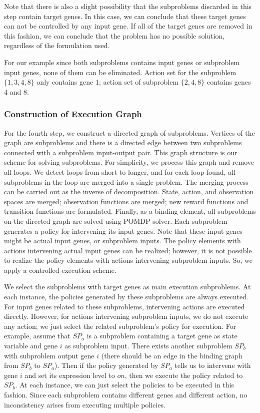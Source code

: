 Note that there is also a slight possibility that the subproblems discarded in this step contain target
genes. In this case, we can conclude that these target genes can not be controlled by any input gene. If all
of the target genes are removed in this fashion, we can conclude that the problem has no possible solution,
regardless of the formulation used.

For our example since both subproblems contains input genes or subproblem input genes, none of them can be eliminated. Action set for the subproblem $\{1,3,4,8\}$ only contains gene 1; action set of subproblem $\{2,4,8\}$ contains genes 4 and 8.

\subsubsection{Construction of Execution Graph}
For the fourth step, we construct a directed graph of subproblems. Vertices of the graph are subproblems and
there is a directed edge between two subproblems connected with a subproblem input-output pair. This graph
structure is our scheme for solving subproblems. For simplicity, we process this graph and remove all loops.
We detect loops from short to longer, and for each loop found, all subproblems in the loop are merged into a
single problem. The merging process can be carried out as the inverse of decomposition. State, action, and
observation spaces are merged; observation functions are merged; new reward functions and transition
functions are formulated. Finally, as a binding element, all subproblems on the directed graph are solved
using POMDP solver. Each subproblem generates a policy for intervening its input genes. Note that these input
genes might be actual input genes, or subproblem inputs. The policy elements with actions intervening actual
input genes can be realized; however, it is not possible to realize the policy elements with actions
intervening subproblem inputs. So, we apply a controlled execution scheme.

We select the subproblems with target genes as main execution subproblems. At each instance, the policies
generated by these subproblems are always executed. For input genes related to these subproblems, intervening
actions are executed directly. However, for actions intervening subproblem inputs, we do not execute any
action; we just select the related subproblem's policy for execution. For example, assume that $SP_a$ is a
subproblem containing a target gene as state variable and gene $i$ as subproblem input. There exists another
subproblem $SP_b$ with subproblem output gene $i$ (there should be an edge in the binding graph from $SP_b$
to $SP_a$). Then if the policy generated by $SP_a$ tells us to intervene with gene $i$ and set its expression
level to $on$, then we execute the policy related to $SP_b$. At each instance, we can just select the
policies to be executed in this fashion. Since each subproblem contains different genes and different action,
no inconsistency arises from executing multiple policies.

